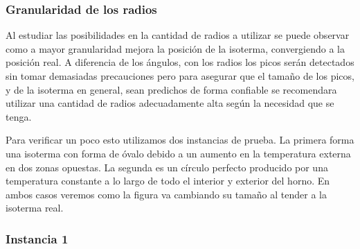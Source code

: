 \subsubsection{Granularidad de los radios}
Al estudiar las posibilidades en la cantidad de radios a utilizar se puede observar como a mayor granularidad mejora la posición de la isoterma, convergiendo a la posición real. A diferencia de los ángulos, con los radios los picos serán detectados sin tomar demasiadas precauciones pero para asegurar que el tamaño de los picos, y de la isoterma en general, sean predichos de forma confiable se recomendara utilizar una cantidad de radios adecuadamente alta según la necesidad que se tenga.

Para verificar un poco esto utilizamos dos instancias de prueba. La primera forma una isoterma con forma de óvalo debido a un aumento en la temperatura externa en dos zonas opuestas. La segunda es un círculo perfecto producido por una temperatura constante a lo largo de todo el interior y exterior del horno. En ambos casos veremos como la figura va cambiando su tamaño al tender a la isoterma real.

\subsubsection{Instancia 1}

